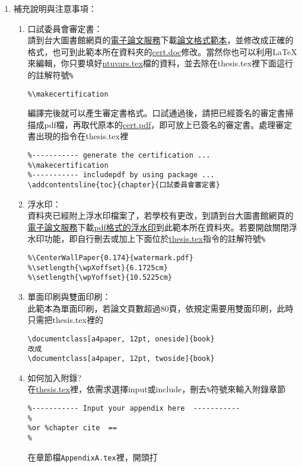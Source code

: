 \begin{acknowledgementsCH}
\begin{enumerate}[leftmargin=0pt, topsep=0pt, itemsep=0pt, label=\Roman{*}.]
\begin{enumerate}[topsep=0pt, itemsep=0pt, label=\arabic{*}.]
\end{enumerate} 
\item 補充說明與注意事項：
\begin{enumerate}[topsep=0pt, itemsep=0pt, label=$\bullet$]
    \item 口試委員會審定書：\\
    請到台大圖書館網頁的\href{http://etds.lib.ntu.edu.tw/etdsystem/submit/submitLogin}{電子論文服務}下載\href{http://gra103.aca.ntu.edu.tw/gra2007/gra/tienn/\%E5\%AD\%B8\%E4\%BD\%8D\%E8\%80\%83\%E8\%A9\%A6\%E8\%A1\%A8\%E5\%86\%8A/THESISSAMPLE.DOC}{論文格式範本}，並修改成正確的格式，也可到此範本所在資料夾的\href{run:./cert.doc}{cert.doc}修改。當然你也可以利用LaTeX來編輯，你只要填好\href{run:./ntuvars.tex}{ntuvars.tex}檔的資料，並去除在thesis.tex裡下面這行的註解符號\texttt{\%} 
    \begin{verbatim}
%\makecertification
    \end{verbatim}
    編譯完後就可以產生審定書格式。口試通過後，請把已經簽名的審定書掃描成pdf檔，再取代原本的\href{run:./cert.pdf}{cert.pdf}，即可放上已簽名的審定書。處理審定書出現的指令在thesis.tex裡 
    \begin{verbatim}
%----------- generate the certification ...
%\makecertification
%----------- includepdf by using package ...
\addcontentsline{toc}{chapter}{口試委員會審定書}

    \end{verbatim}
    \item 浮水印：\\
    資料夾已經附上浮水印檔案了，若學校有更改，到請到台大圖書館網頁的\href{http://etds.lib.ntu.edu.tw/etdsystem/submit/submitLogin}{電子論文服務}下載\href{http://etds.lib.ntu.edu.tw/files/watermark.pdf}{pdf格式的浮水印}到此範本所在資料夾。若要開啟關閉浮水印功能，即自行刪去或加上下面位於\href{run:./thesis.tex}{thesis.tex}指令的註解符號\texttt{\%}
    \begin{verbatim}
%\CenterWallPaper{0.174}{watermark.pdf}
%\setlength{\wpXoffset}{6.1725cm}
%\setlength{\wpYoffset}{10.5225cm}
    \end{verbatim}
    \item 單面印刷與雙面印刷：\\
    此範本為單面印刷，若論文頁數超過80頁，依規定需要用雙面印刷，此時只需把thesis.tex裡的
    \begin{verbatim}
\documentclass[a4paper, 12pt, oneside]{book}
改成
\documentclass[a4paper, 12pt, twoside]{book}
    \end{verbatim}
        \item 如何加入附錄?\\
    在\href{run:./thesis.tex}{thesis.tex}裡，依需求選擇input或include，刪去\texttt{\%}符號來輸入附錄章節
    \begin{verbatim}
%----------- Input your appendix here  -----------
%
%or %chapter cite  == 
%
    \end{verbatim}
    在章節檔\texttt{AppendixA.tex}裡，開頭打
    \begin{verbatim}

\end{verbatim}
\end{enumerate}
\end{enumerate}
\end{acknowledgementsCH}
